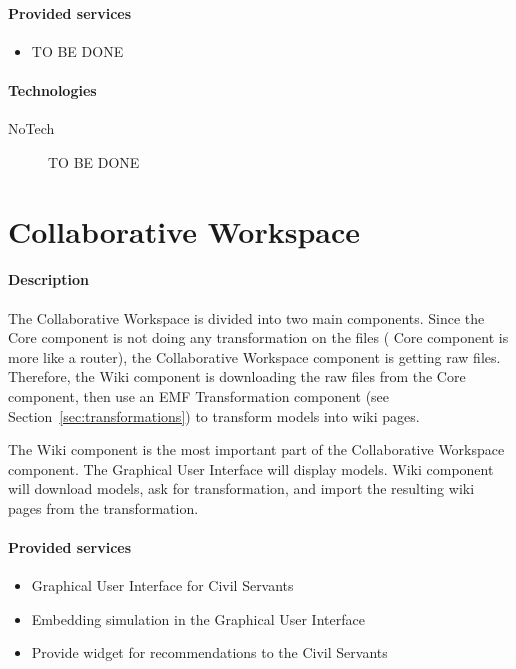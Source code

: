 \documentclass{learnpad}
\begin{document}
\paragraph{Provided services}
\begin{itemize}
	\item TO BE DONE
\end{itemize}

\paragraph{Technologies}
\begin{description}
	\item[NoTech] TO BE DONE
\end{description}

\section{Collaborative Workspace}\label{sec:collaborative-workspace}
\paragraph{Description}
The Collaborative Workspace is divided into two main components.  Since the
\learnpad Core component is not doing any transformation on the files (\learnpad
Core component is more like a router), the Collaborative Workspace component is
getting raw files.  Therefore, the Wiki component is downloading the raw files
from the \learnpad Core component, then use an EMF Transformation component (see
Section~\ref{sec:transformations}) to transform models into wiki pages.

The Wiki component is the most important part of the Collaborative Workspace
component.  The Graphical User Interface will display models.  Wiki component
will download models, ask for transformation, and import the resulting wiki
pages from the transformation.

\paragraph{Provided services}
\begin{itemize}
	\item Graphical User Interface for Civil Servants
	\item Embedding simulation in the Graphical User Interface
	\item Provide widget for recommendations to the Civil Servants
\end{itemize}
\end{document}
